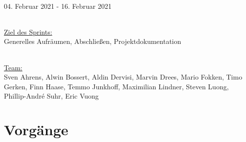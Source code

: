 \documentclass[12pt,a4paper, oneside]{article}
\begin{document}
    \\
    04. Februar 2021 - 16. Februar 2021

    \noindent
    \\
    \underline{Ziel des Sprints:}
    \\
    Generelles Aufräumen, Abschließen, Projektdokumentation

    \noindent
    \\
    \underline {Team:}
    \\
    Sven Ahrens, Alwin Bossert, Aldin Dervisi, Marvin Drees, Mario Fokken,
    Timo Gerken, Finn Haase, Temmo Junkhoff, Maximilian Lindner, Steven Luong, Phillip-André Suhr, Eric Vuong


    \section{Vorgänge}
\end{document}
